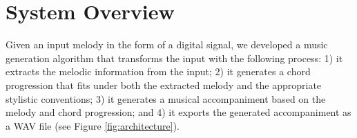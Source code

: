 \section{System Overview}

Given an input melody in the form of a digital signal, we developed a music generation algorithm that transforms the input with the following process: 1) it extracts the melodic information from the input; 2) it generates a chord progression that fits under both the extracted melody and the appropriate stylistic conventions; 3) it generates a musical accompaniment based on the melody and chord progression; and 4) it exports the generated accompaniment as a WAV file (see Figure \ref{fig:architecture}).

\begin{figure*}
    \begin{center}
        \resizebox{\linewidth}{!}{}
    \end{center}
    \caption{An overview of the architecture of Piranha Plants as Charade.}
    \label{fig:architecture}
\end{figure*}








